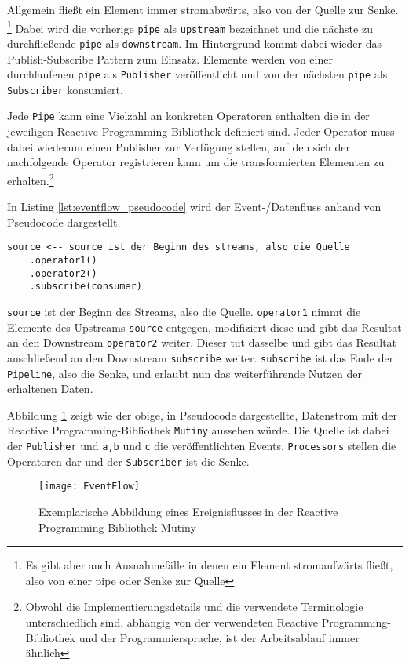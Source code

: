 Allgemein fließt ein Element immer stromabwärts, also von der Quelle zur Senke.
\footnote{Es gibt aber auch Ausnahmefälle in denen ein Element stromaufwärts fließt, also von einer pipe oder Senke zur Quelle}
Dabei wird die vorherige \verb|pipe| als \verb|upstream| bezeichnet und die nächste zu durchfließende \verb|pipe| als \verb|downstream|.
Im Hintergrund kommt dabei wieder das Publish-Subscribe Pattern zum Einsatz. Elemente werden von einer durchlaufenen \verb|pipe| als \verb|Publisher|
veröffentlicht und von der nächsten \verb|pipe| als \verb|Subscriber| konsumiert.

Jede \verb|Pipe| kann eine Vielzahl an konkreten Operatoren enthalten die in der jeweiligen Reactive Programming-Bibliothek definiert sind.
Jeder Operator muss dabei wiederum einen Publisher zur Verfügung stellen, auf den sich der nachfolgende Operator registrieren kann
um die transformierten Elementen zu erhalten.\footnote{Obwohl die Implementierungsdetails und die verwendete Terminologie unterschiedlich sind, abhängig von der verwendeten Reactive Programming-Bibliothek
  und der Programmiersprache, ist der Arbeitsablauf immer ähnlich}

In Listing \ref{lst:eventflow_pseudocode} wird der Event-/Datenfluss anhand von Pseudocode dargestellt.
\begin{lstlisting}[caption=Pseudocode Event-/Datenfluss, captionpos=b, label=lst:eventflow_pseudocode]
source <-- source ist der Beginn des streams, also die Quelle
	.operator1() 
	.operator2() 
	.subscribe(consumer)
\end{lstlisting}
\verb|source| ist der Beginn des Streams, also die Quelle. \verb|operator1| nimmt die Elemente des Upstreams \verb|source| entgegen,
modifiziert diese und gibt das Resultat an den Downstream \verb|operator2| weiter.
Dieser tut dasselbe und gibt das Resultat anschließend an den Downstream \verb|subscribe| weiter.
\verb|subscribe| ist das Ende der \verb|Pipeline|, also die Senke, und erlaubt nun das weiterführende Nutzen der erhaltenen Daten.

Abbildung \ref{fig:eventflow_mutiny} zeigt wie der obige, in Pseudocode dargestellte, Datenstrom
mit der Reactive Programming-Bibliothek \verb|Mutiny| aussehen würde.
Die Quelle ist dabei der \verb|Publisher| und \verb|a,b| und \verb|c| die veröffentlichten Events.
\verb|Processors| stellen die Operatoren dar und der \verb|Subscriber| ist die Senke.

\begin{figure}[ht!]
  \centering
  \texttt{[image: EventFlow]}
  \caption{Exemplarische Abbildung eines Ereignisflusses in der Reactive Programming-Bibliothek Mutiny \parencite{MutinyEventFlow}}
  \label{fig:eventflow_mutiny}
\end{figure}

